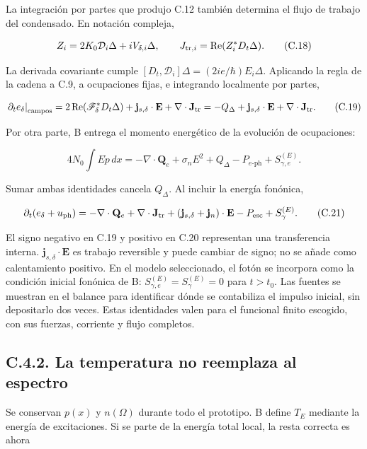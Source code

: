 \documentclass[
  spanish,
  10pt,
  a4paper,
]{article}
\begin{document}
La integración por partes que produjo C.12 también determina el flujo de
trabajo del condensado. En notación compleja,

\[
Z_i=2K_0\mathcal D_i\Delta+iV_{\delta,i}\Delta,
\qquad J_{{\rm tr},i}=\operatorname{Re}(Z_i^*D_t\Delta).
\tag{C.18}
\]

La derivada covariante cumple
\([D_t,\mathcal D_i]\Delta=(2ie/\hbar)E_i\Delta\). Aplicando la regla de
la cadena a C.9, a ocupaciones fijas, e integrando localmente por
partes,

\[
\left.\partial_te_\delta\right|_{\rm campos}
=2\operatorname{Re}(\mathscr F_\delta^*D_t\Delta)
+\mathbf j_{s,\delta}\cdot\mathbf E+\nabla\cdot\mathbf J_{\rm tr}
=-Q_\Delta+\mathbf j_{s,\delta}\cdot\mathbf E+\nabla\cdot\mathbf J_{\rm tr}.
\tag{C.19}
\]

Por otra parte, B entrega el momento energético de la evolución de
ocupaciones:

\[
4N_0\int E\dot p\,dx=-\nabla\cdot\mathbf Q_e
+\sigma_nE^2+Q_\Delta-P_{e\text{-ph}}+S_{\gamma,e}^{(E)}.
\tag{C.20}
\]

Sumar ambas identidades cancela \(Q_\Delta\). Al incluir la energía
fonónica,

\[
\partial_t(e_\delta+u_{\rm ph})
=-\nabla\cdot\mathbf Q_e+\nabla\cdot\mathbf J_{\rm tr}
+(\mathbf j_{s,\delta}+\mathbf j_n)\cdot\mathbf E
-P_{\rm esc}+S_\gamma^{(E)}.
\tag{C.21}
\]

El signo negativo en C.19 y positivo en C.20 representan una
transferencia interna. \(\mathbf j_{s,\delta}\cdot\mathbf E\) es trabajo
reversible y puede cambiar de signo; no se añade como calentamiento
positivo. En el modelo seleccionado, el fotón se incorpora como la
condición inicial fonónica de B: \(S_{\gamma,e}^{(E)}=S_\gamma^{(E)}=0\)
para \(t>t_0\). Las fuentes se muestran en el balance para identificar
dónde se contabiliza el impulso inicial, sin depositarlo dos veces.
Estas identidades valen para el funcional finito escogido, con sus
fuerzas, corriente y flujo completos.

\subsection{C.4.2. La temperatura no reemplaza al
espectro}\label{c.4.2.-la-temperatura-no-reemplaza-al-espectro}

Se conservan \(p(x)\) y \(n(\Omega)\) durante todo el prototipo. B
define \(T_E\) mediante la energía de excitaciones. Si se parte de la
energía total local, la resta correcta es ahora
\end{document}
